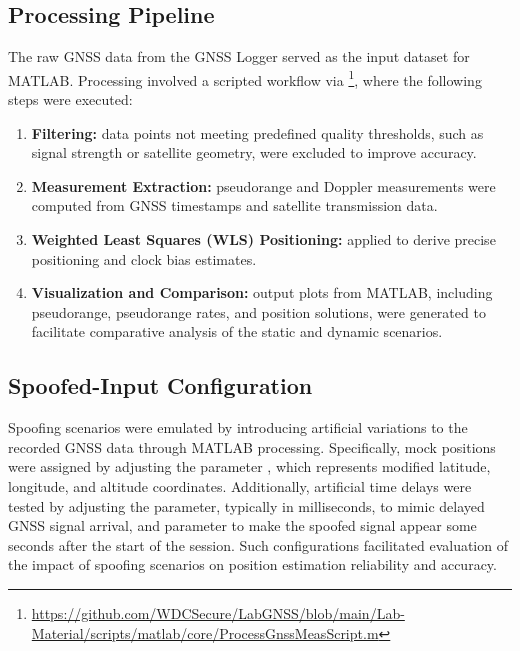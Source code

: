     \subsection{Processing Pipeline}
    
        The raw GNSS data from the GNSS Logger served as the input dataset for MATLAB. 
        Processing involved a scripted workflow via \footnote{\url{https://github.com/WDCSecure/LabGNSS/blob/main/Lab-Material/scripts/matlab/core/ProcessGnssMeasScript.m}}, where the following steps were executed:
        
        \begin{enumerate}
            \item \textbf{Filtering:} data points not meeting predefined quality thresholds, such as signal strength or satellite geometry, were excluded to improve accuracy.
            \item \textbf{Measurement Extraction:} pseudorange and Doppler measurements were computed from GNSS timestamps and satellite transmission data.
            \item \textbf{Weighted Least Squares (WLS) Positioning:} applied to derive precise positioning and clock bias estimates.
            \item \textbf{Visualization and Comparison:} output plots from MATLAB, including pseudorange, pseudorange rates, and position solutions, were generated to facilitate comparative analysis of the static and dynamic scenarios.
        \end{enumerate}

    
    \subsection{Spoofed-Input Configuration}

        Spoofing scenarios were emulated by introducing artificial variations to the recorded GNSS data through MATLAB processing. 
        Specifically, mock positions were assigned by adjusting the parameter , which represents modified latitude, longitude, and altitude coordinates. 
        Additionally, artificial time delays were tested by adjusting the  parameter, typically in milliseconds, to mimic delayed GNSS signal arrival, and  parameter to make the spoofed signal appear some seconds after the start of the session.
        Such configurations facilitated evaluation of the impact of spoofing scenarios on position estimation reliability and accuracy.

